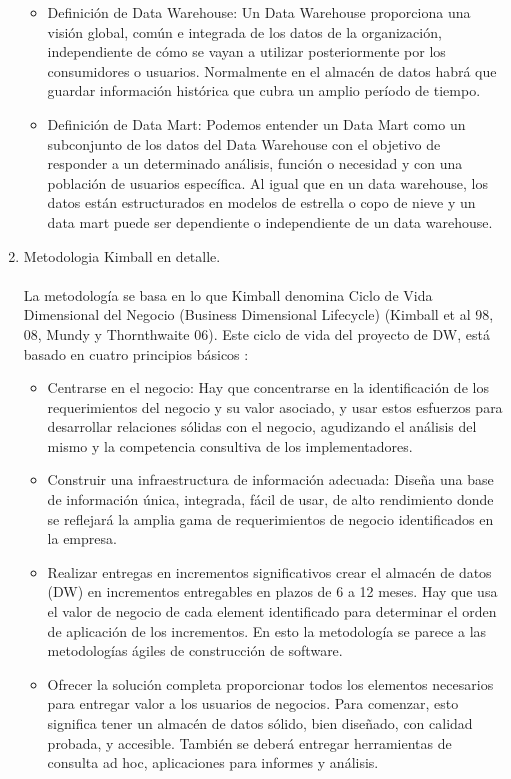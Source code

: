 \documentclass[preprint,12pt]{elsarticle}
\begin{document}
\begin{enumerate}[3.1]
\begin{itemize}
		\item Definición de Data Warehouse: Un Data Warehouse proporciona una visión global, común e integrada de los datos de la organización, independiente de cómo se vayan a utilizar posteriormente por los consumidores o usuarios. Normalmente en el almacén de datos habrá que guardar información histórica que cubra un amplio período de tiempo. \\
		\item Definición de Data Mart: Podemos entender un Data Mart como un subconjunto de los datos del Data Warehouse con el objetivo de responder a un determinado análisis, función o necesidad y con una población de usuarios específica. Al igual que en un data warehouse, los datos están estructurados en modelos de estrella o copo de nieve y un data mart puede ser dependiente o independiente de un data warehouse. \\
\end{itemize}



    \item Metodologia Kimball en detalle.\\
\\

La metodología se basa en lo que Kimball denomina Ciclo de Vida Dimensional del Negocio (Business Dimensional Lifecycle) (Kimball et al 98, 08, Mundy y Thornthwaite 06). Este ciclo de vida del proyecto de DW, está basado en cuatro principios básicos :
\begin{itemize}
  \item Centrarse en el negocio:  Hay que concentrarse en la identificación de los requerimientos del negocio y su valor asociado, y usar estos esfuerzos para desarrollar relaciones sólidas con el negocio, agudizando el análisis del mismo y la competencia consultiva de los implementadores.
\\
  \item Construir una infraestructura de informaci\'on adecuada: Diseña una base de información única, integrada, fácil de usar, de alto rendimiento donde se reflejará la amplia gama de requerimientos de negocio identificados en la empresa.\\
  \item Realizar entregas en incrementos significativos crear el almacén de datos (DW) en incrementos entregables en plazos de 6 a 12 meses. Hay que usa el valor de negocio de cada element identificado para determinar el orden de aplicación de los incrementos. En esto la metodología se parece a las metodologías ágiles de construcción de software.\\
  \item 
Ofrecer la solución completa proporcionar todos los elementos necesarios para entregar valor a los usuarios de negocios. Para comenzar, esto significa tener un almacén de datos sólido, bien diseñado, con calidad probada, y accesible. También se deberá entregar herramientas de consulta ad hoc, aplicaciones para informes y análisis. \\
\end{itemize} 




\end{enumerate}
\end{document}

